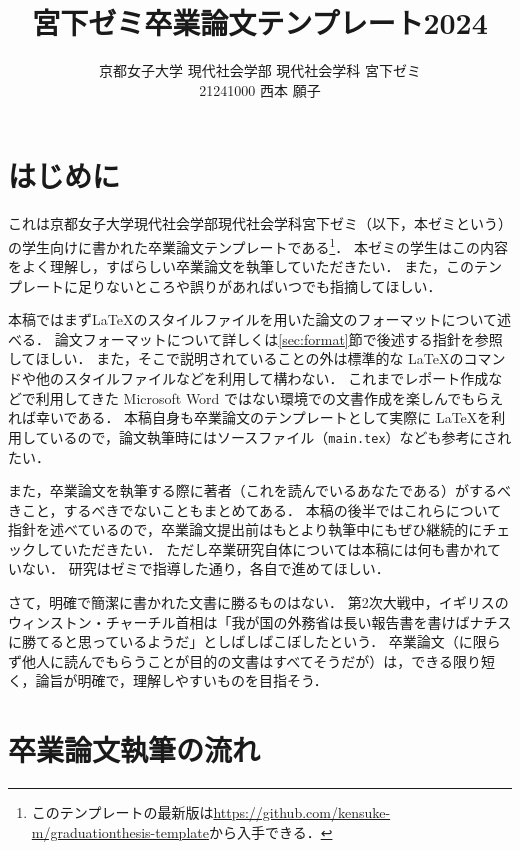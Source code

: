 \documentclass[a4paper,twocolumn,10pt]{jsarticle}
\title{宮下ゼミ卒業論文テンプレート2024}
\author{京都女子大学 現代社会学部 現代社会学科 宮下ゼミ\\
21241000 西本 願子}
\begin{document}
\maketitle

\section{はじめに}
\label{hajimeni}

これは京都女子大学現代社会学部現代社会学科宮下ゼミ（以下，本ゼミという）の学生向けに書かれた卒業論文テンプレートである\footnote{このテンプレートの最新版は\url{https://github.com/kensuke-m/graduationthesis-template}から入手できる．}．
本ゼミの学生はこの内容をよく理解し，すばらしい卒業論文を執筆していただきたい．
また，このテンプレートに足りないところや誤りがあればいつでも指摘してほしい．

本稿ではまず\LaTeX のスタイルファイルを用いた論文のフォーマットについて述べる．
論文フォーマットについて詳しくは\ref{sec:format}節で後述する指針を参照してほしい．
また，そこで説明されていることの外は標準的な \LaTeX のコマンドや他のスタイルファイルなどを利用して構わない．
これまでレポート作成などで利用してきた Microsoft Word ではない環境での文書作成を楽しんでもらえれば幸いである．
本稿自身も卒業論文のテンプレートとして実際に \LaTeX を利用しているので，論文執筆時にはソースファイル（{\tt main.tex}）なども参考にされたい．

また，卒業論文を執筆する際に著者（これを読んでいるあなたである）がするべきこと，するべきでないこともまとめてある．
本稿の後半ではこれらについて指針を述べているので，卒業論文提出前はもとより執筆中にもぜひ継続的にチェックしていただきたい．
ただし卒業研究自体については本稿には何も書かれていない．
研究はゼミで指導した通り，各自で進めてほしい．

さて，明確で簡潔に書かれた文書に勝るものはない．
第2次大戦中，イギリスのウィンストン・チャーチル首相は「我が国の外務省は長い報告書を書けばナチスに勝てると思っているようだ」としばしばこぼしたという\cite{newsweek2021}．
卒業論文（に限らず他人に読んでもらうことが目的の文書はすべてそうだが）は，できる限り短く，論旨が明確で，理解しやすいものを目指そう．

\section{卒業論文執筆の流れ}
\end{document}
